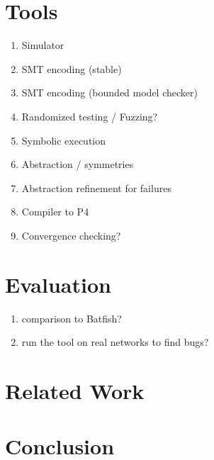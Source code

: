 \documentclass[sigconf,10pt]{acmart}
\begin{document}
\section{Tools}
\label{sec:tools}

\begin{enumerate}
  \item Simulator
  \item SMT encoding (stable)
  \item SMT encoding (bounded model checker)
  \item Randomized testing / Fuzzing?
  \item Symbolic execution 
  \item Abstraction / symmetries
  \item Abstraction refinement for failures
  \item Compiler to P4
  \item Convergence checking?
\end{enumerate}

%
%
%
%

\section{Evaluation}
\label{sec:evaluation}

\begin{enumerate}
  \item comparison to Batfish?
  \item run the tool on real networks to find bugs?
\end{enumerate}

%
%
%
%

\section{Related Work}
\label{sec:related}


%
%
%
%

\section{Conclusion}
\label{sec:conclusions}


%
%
%
%

 


\end{document}
